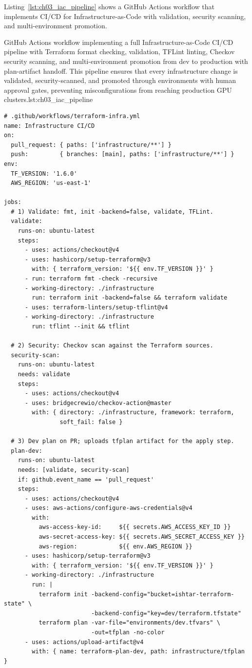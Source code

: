Listing~\ref{lst:ch03_iac_pipeline} shows a GitHub Actions workflow that implements CI/CD for Infrastructure-as-Code with validation, security scanning, and multi-environment promotion.

\begin{codebox}{GitHub Actions workflow implementing a full Infrastructure-as-Code CI/CD pipeline with Terraform format checking, validation, TFLint linting, Checkov security scanning, and multi-environment promotion from dev to production with plan-artifact handoff. This pipeline ensures that every infrastructure change is validated, security-scanned, and promoted through environments with human approval gates, preventing misconfigurations from reaching production GPU clusters.}{lst:ch03_iac_pipeline}
\begin{verbatim}
# .github/workflows/terraform-infra.yml
name: Infrastructure CI/CD
on:
  pull_request: { paths: ['infrastructure/**'] }
  push:         { branches: [main], paths: ['infrastructure/**'] }
env:
  TF_VERSION: '1.6.0'
  AWS_REGION: 'us-east-1'

jobs:
  # 1) Validate: fmt, init -backend=false, validate, TFLint.
  validate:
    runs-on: ubuntu-latest
    steps:
      - uses: actions/checkout@v4
      - uses: hashicorp/setup-terraform@v3
        with: { terraform_version: '${{ env.TF_VERSION }}' }
      - run: terraform fmt -check -recursive
      - working-directory: ./infrastructure
        run: terraform init -backend=false && terraform validate
      - uses: terraform-linters/setup-tflint@v4
      - working-directory: ./infrastructure
        run: tflint --init && tflint

  # 2) Security: Checkov scan against the Terraform sources.
  security-scan:
    runs-on: ubuntu-latest
    needs: validate
    steps:
      - uses: actions/checkout@v4
      - uses: bridgecrewio/checkov-action@master
        with: { directory: ./infrastructure, framework: terraform,
                soft_fail: false }

  # 3) Dev plan on PR; uploads tfplan artifact for the apply step.
  plan-dev:
    runs-on: ubuntu-latest
    needs: [validate, security-scan]
    if: github.event_name == 'pull_request'
    steps:
      - uses: actions/checkout@v4
      - uses: aws-actions/configure-aws-credentials@v4
        with:
          aws-access-key-id:     ${{ secrets.AWS_ACCESS_KEY_ID }}
          aws-secret-access-key: ${{ secrets.AWS_SECRET_ACCESS_KEY }}
          aws-region:            ${{ env.AWS_REGION }}
      - uses: hashicorp/setup-terraform@v3
        with: { terraform_version: '${{ env.TF_VERSION }}' }
      - working-directory: ./infrastructure
        run: |
          terraform init -backend-config="bucket=ishtar-terraform-state" \
                         -backend-config="key=dev/terraform.tfstate"
          terraform plan -var-file="environments/dev.tfvars" \
                         -out=tfplan -no-color
      - uses: actions/upload-artifact@v4
        with: { name: terraform-plan-dev, path: infrastructure/tfplan }


\end{verbatim}
\end{codebox}

